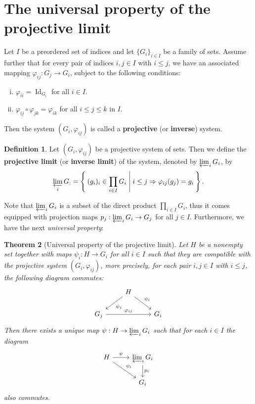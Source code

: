 \documentclass[12pt]{article}
\theoremstyle{plain}
\newtheorem{theorem}{Theorem}[section]
\theoremstyle{definition}
\newtheorem{definition}[theorem]{Definition}
\newenvironment{Theorem}{\colorlet{shadecolor}{OliveGreen!18} \begin{shaded} \begin{theorem}}{ \end{theorem} \end{shaded}}
\newcommand{\Id}{\operatorname{Id}}
\begin{document}
\section{The universal property of the projective limit}\label{Apendice:universal property - projective limit}

Let $I$ be a preordered set of indices and let $\{G_i\}_{i \in I}$ be a family of sets. Assume further that for every pair of indices $i,j \in I$ with $i \leq j$, we have an associated mapping $\varphi_{ij} : G_j \to G_i$, subject to the following conditions:
\begin{enumerate}[(i)]
\item $\varphi_{ii} = \Id_{G_i}$ for all $i \in I$.
\item $\varphi_{ij} \circ \varphi_{jk} = \varphi_{ik}$ for all $i\leq j \leq k$ in $I$.
\end{enumerate}
Then the system $(G_i, \varphi_{ij})$ is called a \textbf{projective} (or \textbf{inverse}) system.

\begin{definition}
Let $(G_i, \varphi_{ij})$ be a projective system of sets. Then we define the \textbf{projective limit} (or \textbf{inverse limit}) of the system, denoted by $\varprojlim_i G_i$, by
\[
    \varprojlim_i G_ := \Set{(g_i)_i \in \prod_{i \in I} G_i | i \leq j \Rightarrow \varphi_{ij} (g_j) = g_i}.
\]
\end{definition}
Note that $\varprojlim_i G_i$ is a subset of the direct product $\prod_{i \in I} G_i$, thus it comes equipped with projection maps $p_j : \varprojlim_i G_i \to G_j$ for all $j \in I$. Furthermore, we have the next \textit{universal property}:

\begin{Theorem}[Universal property of the projective limit]
Let $H$ be a nonempty set together with maps $\psi_i : H \to G_i$ for all $i \in I$ such that they are compatible with the projective system $(G_i, \varphi_{ij})$, more precisely, for each pair $i,j \in I$ with $i \leq j$, the following diagram commutes:
\[
    \begin{tikzcd}
        & H \ar[dl, "\psi_j"] \ar[dr, "\psi_i"] & \\
        G_j \ar[rr, "\varphi_{ij}"]& &  G_i
    \end{tikzcd}
\]
Then there exists a unique map $\psi : H \to \varprojlim_i G_i$ such that for each $i \in I$ the diagram
\[
    \begin{tikzcd}
    H \ar[r, "\psi"] \ar[rd, "\psi_i"] & \varprojlim_i G_i \ar[d, "p_i"]\\
    & G_i
    \end{tikzcd}
\]
also commutes.
\end{Theorem}
\end{document}
